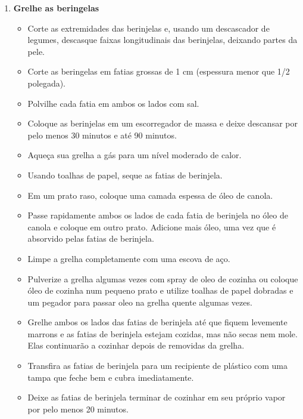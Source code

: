 \documentclass [11pt, papel de carta] {article}
\begin{document}
\begin {description}
\begin {enumerate}
\begin {itemize}
\item Retire do forno e mantenha coberto para permanecer quente até a hora de montar o prato.
\end {itemize}
\item {\bf Grelhe as beringelas}
\begin {itemize}
\item Corte as extremidades das berinjelas e, usando um descascador de legumes, descasque faixas longitudinais das berinjelas, deixando partes da pele.
\item Corte as beringelas em fatias grossas de 1 cm (espessura menor que 1/2 polegada).
\item Polvilhe cada fatia em ambos os lados com sal.
\item Coloque as berinjelas em um escorregador de massa e deixe descansar por pelo menos 30 minutos e até 90 minutos.
\item Aqueça sua grelha a gás para um nível moderado de calor.
\item Usando toalhas de papel, seque as fatias de berinjela.
\item Em um prato raso, coloque uma camada espessa de óleo de canola.
\item Passe rapidamente ambos os lados de cada fatia de berinjela no óleo de canola e coloque em outro prato. Adicione mais óleo, uma vez que é absorvido pelas fatias de berinjela.
\item Limpe a grelha completamente com uma escova de aço.
\item Pulverize a grelha algumas vezes com spray de oleo de cozinha ou coloque óleo de cozinha num pequeno prato e utilize toalhas de papel dobradas e um pegador para passar oleo na grelha quente algumas vezes.
\item Grelhe ambos os lados das fatias de berinjela até que fiquem levemente marrons e as fatias de berinjela estejam cozidas, mas não secas nem mole. Elas continuarão a cozinhar depois de removidas da grelha.
\item Transfira as fatias de berinjela para um recipiente de plástico com uma tampa que feche bem e cubra imediatamente.
\item Deixe as fatias de berinjela terminar de cozinhar em seu próprio vapor por pelo menos 20 minutos.
\end {itemize}


\end{enumerate}
\end{description}
\end{document}
